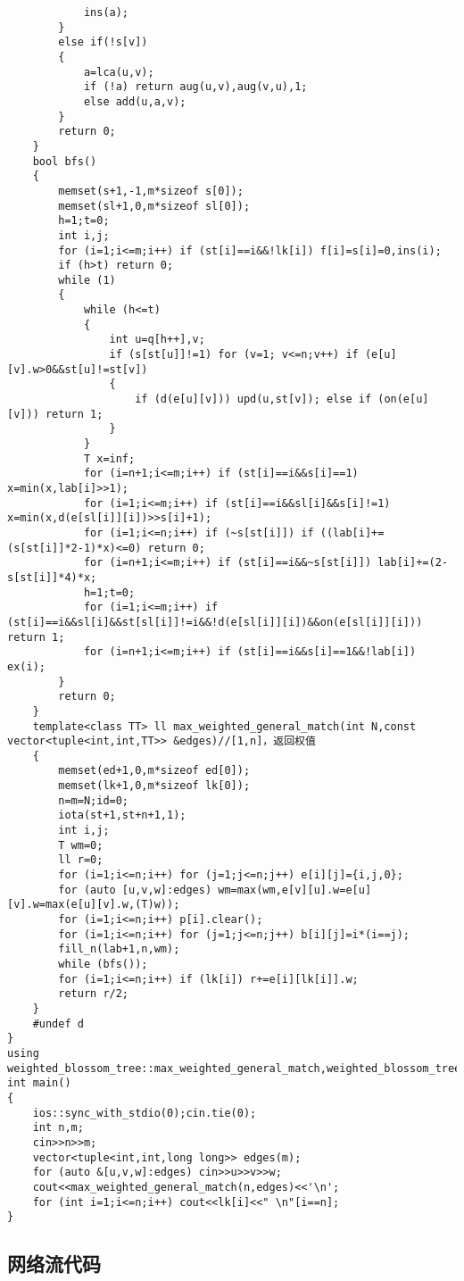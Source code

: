 \documentclass[12pt]{ctexart}
\begin{document}
\begin{lstlisting}
			ins(a);
		}
		else if(!s[v])
		{
			a=lca(u,v);
			if (!a) return aug(u,v),aug(v,u),1;
			else add(u,a,v);
		}
		return 0;
	}
	bool bfs()
	{
		memset(s+1,-1,m*sizeof s[0]);
		memset(sl+1,0,m*sizeof sl[0]);
		h=1;t=0;
		int i,j;
		for (i=1;i<=m;i++) if (st[i]==i&&!lk[i]) f[i]=s[i]=0,ins(i);
		if (h>t) return 0;
		while (1)
		{
			while (h<=t)
			{
				int u=q[h++],v;
				if (s[st[u]]!=1) for (v=1; v<=n;v++) if (e[u][v].w>0&&st[u]!=st[v])
				{
					if (d(e[u][v])) upd(u,st[v]); else if (on(e[u][v])) return 1;
				}
			}
			T x=inf;
			for (i=n+1;i<=m;i++) if (st[i]==i&&s[i]==1) x=min(x,lab[i]>>1);
			for (i=1;i<=m;i++) if (st[i]==i&&sl[i]&&s[i]!=1) x=min(x,d(e[sl[i]][i])>>s[i]+1);
			for (i=1;i<=n;i++) if (~s[st[i]]) if ((lab[i]+=(s[st[i]]*2-1)*x)<=0) return 0;
			for (i=n+1;i<=m;i++) if (st[i]==i&&~s[st[i]]) lab[i]+=(2-s[st[i]]*4)*x;
			h=1;t=0;
			for (i=1;i<=m;i++) if (st[i]==i&&sl[i]&&st[sl[i]]!=i&&!d(e[sl[i]][i])&&on(e[sl[i]][i])) return 1;
			for (i=n+1;i<=m;i++) if (st[i]==i&&s[i]==1&&!lab[i]) ex(i);
		}
		return 0;
	}
	template<class TT> ll max_weighted_general_match(int N,const vector<tuple<int,int,TT>> &edges)//[1,n]，返回权值
	{
		memset(ed+1,0,m*sizeof ed[0]);
		memset(lk+1,0,m*sizeof lk[0]);
		n=m=N;id=0;
		iota(st+1,st+n+1,1);
		int i,j;
		T wm=0;
		ll r=0;
		for (i=1;i<=n;i++) for (j=1;j<=n;j++) e[i][j]={i,j,0};
		for (auto [u,v,w]:edges) wm=max(wm,e[v][u].w=e[u][v].w=max(e[u][v].w,(T)w));
		for (i=1;i<=n;i++) p[i].clear();
		for (i=1;i<=n;i++) for (j=1;j<=n;j++) b[i][j]=i*(i==j);
		fill_n(lab+1,n,wm);
		while (bfs());
		for (i=1;i<=n;i++) if (lk[i]) r+=e[i][lk[i]].w;
		return r/2;
	}
	#undef d
}
using weighted_blossom_tree::max_weighted_general_match,weighted_blossom_tree::lk;
int main()
{
	ios::sync_with_stdio(0);cin.tie(0);
	int n,m;
	cin>>n>>m;
	vector<tuple<int,int,long long>> edges(m);
	for (auto &[u,v,w]:edges) cin>>u>>v>>w;
	cout<<max_weighted_general_match(n,edges)<<'\n';
	for (int i=1;i<=n;i++) cout<<lk[i]<<" \n"[i==n];
}
\end{lstlisting}

\subsection{网络流代码}
\end{document}
